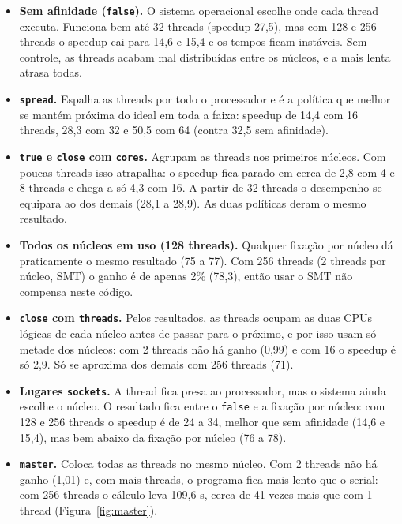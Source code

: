 \documentclass[a4paper,12pt]{article}
\begin{document}
\begin{itemize}
    \item \textbf{Sem afinidade (\texttt{false}).} O sistema operacional escolhe onde cada thread executa. Funciona bem até 32 threads (speedup 27,5), mas com 128 e 256 threads o speedup cai para 14,6 e 15,4 e os tempos ficam instáveis. Sem controle, as threads acabam mal distribuídas entre os núcleos, e a mais lenta atrasa todas.

    \item \textbf{\texttt{spread}.} Espalha as threads por todo o processador e é a política que melhor se mantém próxima do ideal em toda a faixa: speedup de 14,4 com 16 threads, 28,3 com 32 e 50,5 com 64 (contra 32,5 sem afinidade).

    \item \textbf{\texttt{true} e \texttt{close} com \texttt{cores}.} Agrupam as threads nos primeiros núcleos. Com poucas threads isso atrapalha: o speedup fica parado em cerca de 2,8 com 4 e 8 threads e chega a só 4,3 com 16. A partir de 32 threads o desempenho se equipara ao dos demais (28,1 a 28,9). As duas políticas deram o mesmo resultado.

    \item \textbf{Todos os núcleos em uso (128 threads).} Qualquer fixação por núcleo dá praticamente o mesmo resultado (75 a 77). Com 256 threads (2 threads por núcleo, SMT) o ganho é de apenas 2\% (78,3), então usar o SMT não compensa neste código.

    \item \textbf{\texttt{close} com \texttt{threads}.} Pelos resultados, as threads ocupam as duas CPUs lógicas de cada núcleo antes de passar para o próximo, e por isso usam só metade dos núcleos: com 2 threads não há ganho (0,99) e com 16 o speedup é só 2,9. Só se aproxima dos demais com 256 threads (71).

    \item \textbf{Lugares \texttt{sockets}.} A thread fica presa ao processador, mas o sistema ainda escolhe o núcleo. O resultado fica entre o \texttt{false} e a fixação por núcleo: com 128 e 256 threads o speedup é de 24 a 34, melhor que sem afinidade (14,6 e 15,4), mas bem abaixo da fixação por núcleo (76 a 78).

    \item \textbf{\texttt{master}.} Coloca todas as threads no mesmo núcleo. Com 2 threads não há ganho (1,01) e, com mais threads, o programa fica mais lento que o serial: com 256 threads o cálculo leva 109,6 s, cerca de 41 vezes mais que com 1 thread (Figura~\ref{fig:master}).
\end{itemize}
\end{document}
